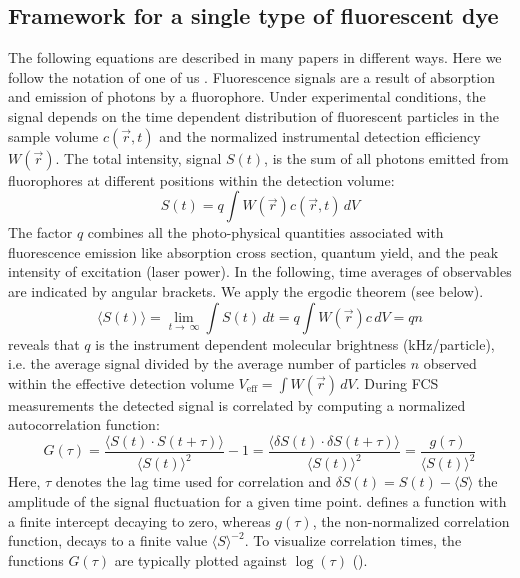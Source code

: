 \subsection{Framework for a single type of fluorescent dye}
\label{sec:theor.frame}
The following equations are described in many papers in different ways. Here we follow the notation of one of us \cite{Weidemann2009}. Fluorescence signals are a result of absorption and emission of photons by a fluorophore. Under experimental conditions, the signal depends on the time dependent distribution of fluorescent particles in the sample volume $c(\vec{r},t)$ and the normalized instrumental detection efficiency $W(\vec{r})$. The total intensity, signal $S(t)$, is the sum of all photons emitted from fluorophores at different positions within the detection volume:
	\begin{equation}
	\label{eq1}
	S(t) = q \int W(\vec{r})  c(\vec{r},t) \,dV
	\end{equation}
The factor $q$ combines all the photo-physical quantities associated with fluorescence emission like absorption cross section, quantum yield, and the peak intensity of excitation (laser power). In the following, time averages of observables are indicated by angular brackets. We apply the ergodic theorem (see below).
	\begin{equation}
	\label{eq2}
	\langle S(t) \rangle = \lim_{t\to\ \infty} \int S(t) \,dt = q \int W(\vec{r})  c \,dV = qn
	\end{equation}
 reveals that $q$ is the instrument dependent molecular brightness (kHz/particle), i.e. the average signal divided by the average number of particles $n$ observed within the effective detection volume $V_{\mathrm{eff}} = \int W(\vec{r})  \,dV$. During FCS measurements the detected signal is correlated by computing a normalized autocorrelation function: 
	\begin{equation}
	\label{eq3}
	G(\tau) = \frac{\langle S(t) \cdot S(t+\tau)\rangle}{\langle S(t) \rangle^2}-1 = \frac{\langle \delta S(t) \cdot \delta S(t+\tau)\rangle}{\langle S(t) \rangle^2} = \frac{g(\tau)}{\langle S(t) \rangle^2}
	\end{equation}
Here, $\tau$ denotes the lag time used for correlation and $\delta S(t) = S(t)-\langle S \rangle$ the amplitude of the signal fluctuation for a given time point.  defines a function with a finite intercept decaying to zero, whereas $g(\tau)$, the non-normalized correlation function, decays to a finite value $\langle S \rangle^{-2}$. To visualize correlation times, the functions $G(\tau)$ are typically plotted against $\log(\tau)$ ().

